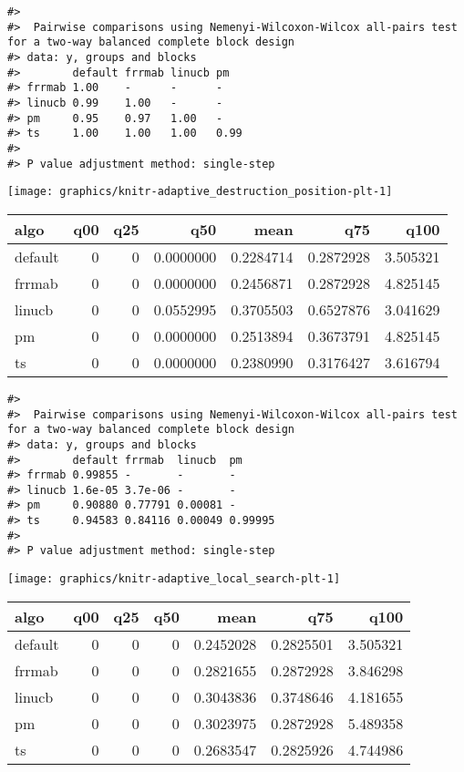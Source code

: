 \documentclass[
]{article}
\begin{document}
\begin{verbatim}
#> 
#>  Pairwise comparisons using Nemenyi-Wilcoxon-Wilcox all-pairs test for a two-way balanced complete block design
#> data: y, groups and blocks
#>        default frrmab linucb pm  
#> frrmab 1.00    -      -      -   
#> linucb 0.99    1.00   -      -   
#> pm     0.95    0.97   1.00   -   
#> ts     1.00    1.00   1.00   0.99
#> 
#> P value adjustment method: single-step
\end{verbatim}

\begin{center}\texttt{[image: graphics/knitr-adaptive\_destruction\_position-plt-1]} \end{center}

\begin{tabular}{lrrrrrr}
\toprule
algo & q00 & q25 & q50 & mean & q75 & q100\\
\midrule
default & 0 & 0 & 0.0000000 & 0.2284714 & 0.2872928 & 3.505321\\
frrmab & 0 & 0 & 0.0000000 & 0.2456871 & 0.2872928 & 4.825145\\
linucb & 0 & 0 & 0.0552995 & 0.3705503 & 0.6527876 & 3.041629\\
pm & 0 & 0 & 0.0000000 & 0.2513894 & 0.3673791 & 4.825145\\
ts & 0 & 0 & 0.0000000 & 0.2380990 & 0.3176427 & 3.616794\\
\bottomrule
\end{tabular}

\begin{verbatim}
#> 
#>  Pairwise comparisons using Nemenyi-Wilcoxon-Wilcox all-pairs test for a two-way balanced complete block design
#> data: y, groups and blocks
#>        default frrmab  linucb  pm     
#> frrmab 0.99855 -       -       -      
#> linucb 1.6e-05 3.7e-06 -       -      
#> pm     0.90880 0.77791 0.00081 -      
#> ts     0.94583 0.84116 0.00049 0.99995
#> 
#> P value adjustment method: single-step
\end{verbatim}

\begin{center}\texttt{[image: graphics/knitr-adaptive\_local\_search-plt-1]} \end{center}

\begin{tabular}{lrrrrrr}
\toprule
algo & q00 & q25 & q50 & mean & q75 & q100\\
\midrule
default & 0 & 0 & 0 & 0.2452028 & 0.2825501 & 3.505321\\
frrmab & 0 & 0 & 0 & 0.2821655 & 0.2872928 & 3.846298\\
linucb & 0 & 0 & 0 & 0.3043836 & 0.3748646 & 4.181655\\
pm & 0 & 0 & 0 & 0.3023975 & 0.2872928 & 5.489358\\
ts & 0 & 0 & 0 & 0.2683547 & 0.2825926 & 4.744986\\
\bottomrule
\end{tabular}
\end{document}
